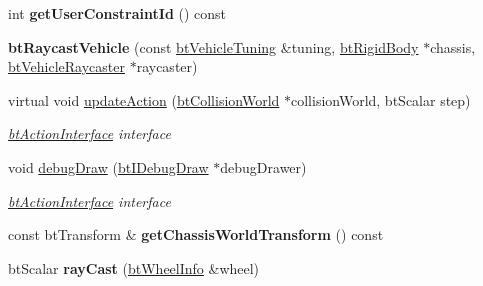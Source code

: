 \begin{DoxyCompactItemize}
\item 
\mbox{\label{classbtRaycastVehicle_a4cbba8434f83154a9240b41ab486e72e}} 
int {\bfseries get\+User\+Constraint\+Id} () const
\item 
\mbox{\label{classbtRaycastVehicle_a7dd285cde99f2fb2b6c6a38ff4e4e151}} 
{\bfseries bt\+Raycast\+Vehicle} (const \hyperlink{classbtRaycastVehicle_1_1btVehicleTuning}{bt\+Vehicle\+Tuning} \&tuning, \hyperlink{classbtRigidBody}{bt\+Rigid\+Body} $\ast$chassis, \hyperlink{structbtVehicleRaycaster}{bt\+Vehicle\+Raycaster} $\ast$raycaster)
\item 
\mbox{\label{classbtRaycastVehicle_a22d127e6b87137131485cdebd65ea5af}} 
virtual void \hyperlink{classbtRaycastVehicle_a22d127e6b87137131485cdebd65ea5af}{update\+Action} (\hyperlink{classbtCollisionWorld}{bt\+Collision\+World} $\ast$collision\+World, bt\+Scalar step)
\begin{DoxyCompactList}\small\item\em \hyperlink{classbtActionInterface}{bt\+Action\+Interface} interface \end{DoxyCompactList}\item 
\mbox{\label{classbtRaycastVehicle_ab5dfeb4a57f735f6fb069bfc5654428d}} 
void \hyperlink{classbtRaycastVehicle_ab5dfeb4a57f735f6fb069bfc5654428d}{debug\+Draw} (\hyperlink{classbtIDebugDraw}{bt\+I\+Debug\+Draw} $\ast$debug\+Drawer)
\begin{DoxyCompactList}\small\item\em \hyperlink{classbtActionInterface}{bt\+Action\+Interface} interface \end{DoxyCompactList}\item 
\mbox{\label{classbtRaycastVehicle_abc911983edd69f2f216cc9cde7ea5906}} 
const bt\+Transform \& {\bfseries get\+Chassis\+World\+Transform} () const
\item 
\mbox{\label{classbtRaycastVehicle_a53451c4e3495561f3f078b2041ef04be}} 
bt\+Scalar {\bfseries ray\+Cast} (\hyperlink{structbtWheelInfo}{bt\+Wheel\+Info} \&wheel)
\item 
\mbox{\label{classbtRaycastVehicle_a696bb095c8d563ad76c521d79fb1f79d}} 

\end{DoxyCompactItemize}

